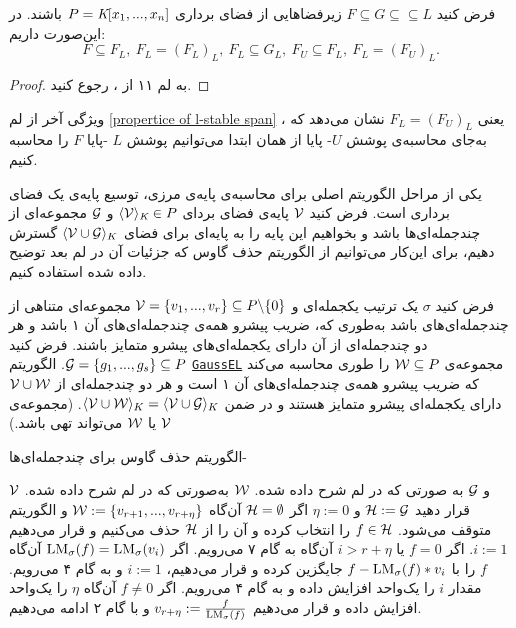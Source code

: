 \begin{lemma}
\label{propertice of l-stable span}
فرض کنید 
$F\subseteq G\subseteq \subseteq L$
زیرفضاهایی از فضای برداری 
$P = \textit{K}[x_{1},...,x_{n}]$
باشند. در این‌صورت داریم:
$$F\subseteq F_{L}, \  F_{L} = (F_{L})_{L}, \ F_{L}\subseteq G_{L}, \  F_{U}\subseteq F_{L}, \ F_{L} = (F_{U})_{L}.$$
\end{lemma}
\begin{proof}
به لم ۱۱ از 
{\small \cite{kehrein2006computing}}
، رجوع کنید.
\end{proof}
ویژگی آخر از لم 
\ref{propertice of l-stable span}
، یعنی 
$F_{L} = (F_{U})_{L}$
نشان می‌دهد که به‌جای محاسبه‌ی پوشش 
$U$-
پایا از همان ابتدا می‌توانیم  پوشش 
$L$
-پایا 
$F$
را محاسبه کنیم. 

یکی از مراحل الگوریتم اصلی برای محاسبه‌ی پایه‌ی مرزی، توسیع پایه‌ی یک فضای برداری است. فرض کنید 
${\mathcal V}$
پایه‌ی فضای بردای 
$\langle {\mathcal V} \rangle_{\textit{K}}\in P$ 
و 
${\mathcal G}$
مجموعه‌ای از چندجمله‌ای‌ها باشد و بخواهیم این پایه را به پایه‌ای برای فضای 
$\langle {\mathcal V} \cup {\mathcal G}\rangle_{K}$
گسترش دهیم، برای این‌کار می‌توانیم از الگوریتم حذف گاوس که جزئیات آن در لم بعد توضیح داده شده استفاده کنیم.
\begin{lemma}
	\label{gaussel lemma}
فرض کنید 
$\sigma$
یک ترتیب یکجمله‌ای و 
${\mathcal V} = \{v_{1},...,v_{r}\}\subseteq P\backslash\{0\}$
مجموعه‌ای متناهی از چندجمله‌ای‌های باشد به‌طوری که، ضریب پیشرو همه‌ی چندجمله‌ای‌های آن ۱ باشد و هر دو چندجمله‌ای از آن دارای یکجمله‌ای‌های پیشرو متمایز باشند. فرض کنید 
${\mathcal G} = \{g_{1},...,g_{s}\}\subseteq P$.
الگوریتم 
\hyperref[GaussEL]{\texttt{GaussEL}}
مجموعه‌ی 
${\mathcal W}\subseteq P$
را طوری محاسبه می‌کند که ضریب پیشرو همه‌ی چندجمله‌ای‌های آن ۱ است و هر دو چندجمله‌ای از 
${\mathcal V}\cup{\mathcal W}$
دارای یکجمله‌ای پیشرو متمایز هستند و در ضمن 
$\langle {\mathcal V}\cup {\mathcal W} \rangle_{K} = \langle {\mathcal V}\cup{\mathcal G} \rangle_{K}$.
(مجموعه‌ی 
${\mathcal V}$
یا 
${\mathcal W}$
می‌تواند تهی باشد.)


\renewcommand{\algorithmicrequire}{\textbf{ورودی}}
\renewcommand{\algorithmicensure}{\textbf{خروجی}}
\begin{algorithm}[H]
	\caption{الگوریتم حذف گاوس برای چندجمله‌ای‌ها-
		}
\label{GaussEL}	
	\begin{algorithmic}[1]				
		\REQUIRE ${\mathcal V}$
		و
		${\mathcal G}$
		به صورتی که در لم شرح داده شده.
		\ENSURE ${\mathcal W}$
		به‌صورتی که در لم شرح داده شده.
		\STATE قرار دهید 
		${\mathcal H}:={\mathcal G}$			
		و
		$\eta:= 0$
		\STATE اگر 
		${\mathcal H} = \emptyset$			
		آن‌گاه 
		${\mathcal W}:=\{v_{r + 1},...,v_{r + \eta}\}$
		و الگوریتم متوقف می‌شود.
		\STATE $f\in {\mathcal H}$			
		را انتخاب کرده و آن را از 
		${\mathcal H}$
		حذف می‌کنیم و قرار می‌دهیم 
		$i:=1$.
		\STATE اگر 
		$f = 0$
		یا 
		$i > r + \eta$
		آن‌گاه به گام ۷ می‌رویم.
		\STATE اگر
		$\operatorname{\mathrm{LM}}_{\sigma}(f) = \operatorname{\mathrm{LM}}_{\sigma}(v_{i})$			
		آن‌گاه 
		$f$
		را با 
		$f - \operatorname{\mathrm{LM}}_{\sigma}(f)*v_{i}$
		جایگزین کرده و قرار می‌دهیم، 
		$i := 1$
		و به گام ۴ می‌رویم.
		\STATE مقدار 
		$i$					
		را یک‌واحد افزایش داده و به گام ۴ می‌رویم.
		\STATE اگر 
		$f\neq 0$
		آن‌گاه 
		$\eta$
		را یک‌واحد افزایش داده  و قرار می‌دهیم 
		$v_{r + \eta}:=\frac{f}{\operatorname{\mathrm{LM}}_{\sigma}(f)}$
		و با گام ۲ ادامه می‌دهیم.						
	\end{algorithmic}
\end{algorithm}
\end{lemma}
